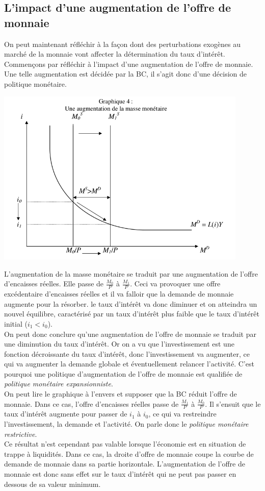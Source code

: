 \documentclass[10pt]{book}
\begin{document}
\subsection{L'impact d'une augmentation de l'offre de monnaie}
On peut maintenant réfléchir à la façon dont des perturbations exogènes au marché de la monnaie vont affecter la détermination du taux d'intérêt. Commençons par réfléchir à l'impact d'une augmentation de l'offre de monnaie. Une telle augmentation est décidée par la BC, il s'agit donc d'une décision de politique monétaire.
\begin{center}
  \includegraphics[width=12cm]{graph19.png}
\end{center}
L'augmentation de la masse monétaire se traduit par une augmentation de l'offre d'encaisses réelles. Elle passe de $\frac{M_0}{P}$ à $\frac{M_1}{P}$. Ceci va provoquer une offre excédentaire d'encaisses réelles et il va falloir que la demande de monnaie augmente pour la résorber. le taux d'intérêt va donc diminuer et on atteindra un nouvel équilibre, caractérisé par un taux d'intérêt plus faible que le taux d'intérêt initial ($i_1 < i_0$). \\
On peut donc conclure qu'une augmentation de l'offre de monnaie se traduit par une diminution du taux d'intérêt. Or on a vu que l'investissement est une fonction décroissante du taux d'intérêt, donc l'investissement va augmenter, ce qui va augmenter la demande globale et éventuellement relancer l'activité. C'est pourquoi une politique d'augmentation de l'offre de monnaie est qualifiée de \textit{politique monétaire expansionniste}.\\
On peut lire le graphique à l'envers et supposer que la BC réduit l'offre de monnaie. Dans ce cas, l'offre d'encaisses réelles passe de $\frac{M_1}{P}$ à $\frac{M_0}{P}$. Il s'ensuit que le taux d'intérêt augmente pour passer de $i_1$ à $i_0$, ce qui va restreindre l'investissement, la demande et l'activité. On parle donc le \textit{politique monétaire restrictive}. \\
Ce résultat n'est cependant pas valable lorsque l'économie est en situation de trappe à liquidités. Dans ce cas, la droite d'offre de monnaie coupe la courbe de demande de monnaie dans sa partie horizontale. L'augmentation de l'offre de monnaie est donc sans effet sur le taux d'intérêt qui ne peut pas passer en dessous de sa valeur minimum.
\end{document}
